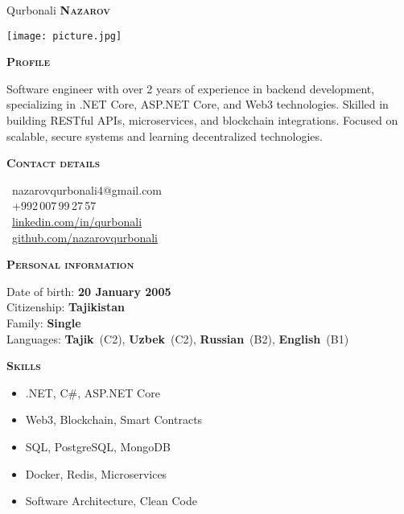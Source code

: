 \documentclass[11pt, a4paper]{article}
\newcommand{\headleft}[1]{\vspace*{3ex}\textsc{\textbf{#1}}\par%
    \vspace*{-1.5ex}\hrulefill\par\vspace*{0.7ex}}
\begin{document}
\setlength{\topskip}{0pt}
\setlength{\parindent}{0pt}
\setlength{\parskip}{0pt}
\setlength{\fboxsep}{0pt}
\pagestyle{empty}
\raggedbottom

\begin{minipage}[t]{0.33\textwidth}
\colorbox{cvblue}{\begin{minipage}[t][5mm][t]{\textwidth}\null\hfill\null\end{minipage}}

\vspace{-.2ex}
\colorbox{cvblue!90}{\color{white}
\textwidth\relax
\begin{minipage}[t][293mm][t]{0.82\textwidth}
\raggedright
\vspace*{2.5ex}

\Large Qurbonali \textbf{\textsc{Nazarov}} \normalsize

\null\hfill\texttt{[image: picture.jpg]}\hfill\null

\vspace*{0.5ex}

\headleft{Profile}
Software engineer with over 2 years of experience in backend development, specializing in .NET Core, ASP.NET Core, and Web3 technologies. Skilled in building RESTful APIs, microservices, and blockchain integrations. Focused on scalable, secure systems and learning decentralized technologies.

\headleft{Contact details}

\small
\hypersetup{
  urlcolor=white,
  linkcolor=white
}
\MVAt\ {\small nazarovqurbonali4@gmail.com} \\[0.4ex]
\Mobilefone\ +992\,007\,99\,27\,57 \\[0.5ex]
\Mundus\ \href{https://linkedin.com/in/qurbonali-nazarov-8837b2310}{linkedin.com/in/qurbonali} \\[0.1ex]
\Mundus\ \href{https://github.com/nazarovqurbonali}{github.com/nazarovqurbonali} \\[0.1ex]
\normalsize

\headleft{Personal information}
Date of birth: \textbf{20 January 2005} \\[0.5ex]
Citizenship: \textbf{Tajikistan} \\[0.5ex]
Family: \textbf{Single } \\[0.5ex]
Languages: \textbf{Tajik}~(C2), \textbf{Uzbek}~(C2), \textbf{Russian}~(B2), \textbf{English}~(B1)

\headleft{Skills}
\begin{itemize}
\item .NET, C\#, ASP.NET Core
\item Web3, Blockchain, Smart Contracts
\item SQL, PostgreSQL, MongoDB
\item Docker, Redis, Microservices
\item Software Architecture, Clean Code
\end{itemize}

\end{minipage}
\textwidth\relax
}
\end{minipage}
\end{document}
